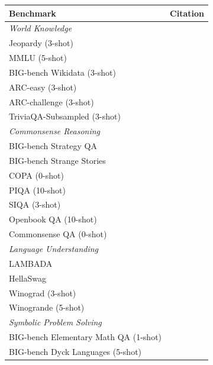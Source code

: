 \documentclass[10pt]{article} %
\begin{document}
\begin{table}[!ht]
    \centering
    \begin{tabular}{l p{6cm}} \toprule 
         \textbf{Benchmark} & \textbf{Citation}  \\ \midrule 
         \textit{World Knowledge} \\
         \quad Jeopardy (3-shot) & \citep{wolfe22jeopardy} \\
         \quad MMLU (5-shot) & \citep{hendrycks2020measuring} \\
         \quad BIG-bench Wikidata (3-shot) & \citep{srivastava2022beyond} \\
         \quad ARC-easy (3-shot) & \citep{clark2018think} \\
         \quad ARC-challenge (3-shot) & \citep{clark2018think} \\
         \quad TriviaQA-Subsampled (3-shot) & \citep{joshi2017triviaqa} \\
         \midrule
         \textit{Commonsense Reasoning} \\
         \quad BIG-bench Strategy QA & \citep{srivastava2022beyond} \\
         \quad BIG-bench Strange Stories & \citep{srivastava2022beyond} \\
         \quad COPA (0-shot) & \citep {roemmele2011choice} \\
         \quad PIQA (10-shot) & \citep{bisk2020piqa} \\
         \quad SIQA (3-shot) & \citep{sap2019socialiqa} \\
         \quad Openbook QA (10-shot) & \citep{mihaylov2018can} \\
         \quad Commonsense QA (0-shot) &  \citep{talmor2018commonsenseqa} \\
         \midrule
         \textit{Language Understanding} \\
         \quad LAMBADA & \citep{paperno2016lambada} \\
         \quad HellaSwag & \citep{zellers2019hellaswag} \\
         \quad Winograd (3-shot) & \citep{levesque2012winograd} \\
         \quad Winogrande (5-shot) & \citep{sakaguchi2021winogrande} \\
         \midrule
         \textit{Symbolic Problem Solving} \\
         \quad BIG-bench Elementary Math QA (1-shot) & \citep{srivastava2022beyond} \\
         \quad BIG-bench Dyck Languages (5-shot) & \citep{srivastava2022beyond}\\

\end{tabular}
\end{table}
\end{document}
